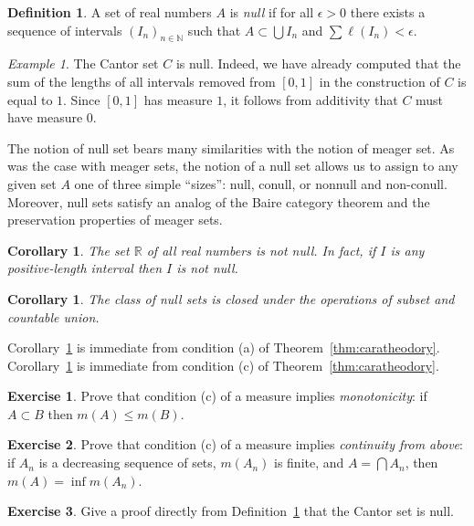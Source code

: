 \documentclass[11pt,oneside]{amsbook}
\newcommand{\NN}{\mathbb N}
\newcommand{\RR}{\mathbb R}
\theoremstyle{definition}
\newtheorem{exerc}{Exercise}[section]
\theoremstyle{plain}
\newtheorem{cor}[thm]{Corollary}
\theoremstyle{definition}
\newtheorem{defn}[thm]{Definition}
\theoremstyle{remark}
\newtheorem{example}[thm]{Example}
\begin{document}
\begin{defn}
  \label{defn:null}
  A set of real numbers $A$ is \emph{null} if for all $\epsilon>0$ there exists a sequence of intervals $(I_n)_{n\in\NN}$ such that $A\subset\bigcup I_n$ and $\sum\ell(I_n)<\epsilon$.
\end{defn}

\begin{example}
  The Cantor set $C$ is null. Indeed, we have already computed that the sum of the lengths of all intervals removed from $[0,1]$ in the construction of $C$ is equal to $1$. Since $[0,1]$ has measure $1$, it follows from additivity that $C$ must have measure $0$.
\end{example}

The notion of null set bears many similarities with the notion of meager set. As was the case with meager sets, the notion of a null set allows us to assign to any given set $A$ one of three simple ``sizes'': null, conull, or nonnull and non-conull. Moreover, null sets satisfy an analog of the Baire category theorem and the preservation properties of meager sets.

\begin{cor}
  \label{cor:interval-nonnull}
  The set $\RR$ of all real numbers is not null. In fact, if $I$ is any positive-length interval then $I$ is not null.
\end{cor}

\begin{cor}
  \label{cor:null-pres}
  The class of null sets is closed under the operations of subset and countable union.
\end{cor}

Corollary~\ref{cor:interval-nonnull} is immediate from condition (a) of Theorem~\ref{thm:caratheodory}. Corollary~\ref{cor:null-pres} is immediate from condition (c) of Theorem~\ref{thm:caratheodory}.

\begin{exerc}
  Prove that condition (c) of a measure implies \emph{monotonicity}: if $A\subset B$ then $m(A)\leq m(B)$.
\end{exerc}

\begin{exerc}
  \label{exerc:continuity-above}
  Prove that condition (c) of a measure implies \emph{continuity from above}: if $A_n$ is a decreasing sequence of sets, $m(A_n)$ is finite, and $A=\bigcap A_n$, then $m(A)=\inf m(A_n)$.
\end{exerc}

\begin{exerc}
  Give a proof directly from Definition~\ref{defn:null} that the Cantor set is null.
\end{exerc}
\end{document}
